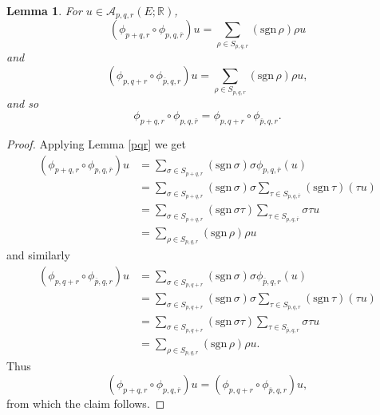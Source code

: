 \documentclass{amsart}
\newcommand{\sgn}{\mathrm{sgn}\,}
\newtheorem{lemma}[theorem]{Lemma}
\theoremstyle{definition}
\begin{document}
\begin{lemma}
For $u \in \mathscr{A}_{p,q,r}(E;\mathbb{R})$,
\[
(\phi_{p+q,r} \circ \phi_{p,q,\overline{r}})u = \sum_{\rho \in S_{p,q,r}} (\sgn \rho) \rho u
\]
and
\[
(\phi_{p,q+r} \circ \phi_{\overline{p},q,r})u = \sum_{\rho \in S_{p,q,r}} (\sgn \rho) \rho u,
\]
and so
\[
\phi_{p+q,r} \circ \phi_{p,q,\overline{r}} = \phi_{p,q+r} \circ \phi_{\overline{p},q,r}.
\]
\label{associative}
\end{lemma}
\begin{proof}
Applying Lemma \ref{pqr} we get
\begin{align*}
(\phi_{p+q,r} \circ \phi_{p,q,\overline{r}})u&=\sum_{\sigma \in S_{p+q,r}} (\sgn \sigma) \sigma \phi_{p,q,\overline{r}}(u)\\
&=\sum_{\sigma \in S_{p+q,r}} (\sgn \sigma) \sigma \sum_{\tau \in S_{p,q,\overline{r}}} (\sgn \tau)(\tau u)\\
&=\sum_{\sigma \in S_{p+q,r}} (\sgn \sigma \tau) \sum_{\tau \in S_{p,q,\overline{r}}} \sigma \tau u\\
&=\sum_{\rho \in S_{p,q,r}} (\sgn \rho) \rho u
\end{align*}
and similarly
\begin{align*}
(\phi_{p,q+r} \circ \phi_{\overline{p},q,r})u&=\sum_{\sigma \in S_{p,q+r}} (\sgn \sigma) \sigma \phi_{\overline{p},q,r}(u)\\
&=\sum_{\sigma \in S_{p,q+r}} (\sgn \sigma) \sigma \sum_{\tau \in S_{\overline{p},q,r}} (\sgn \tau)(\tau u)\\
&=\sum_{\sigma \in S_{p,q+r}} (\sgn \sigma \tau) \sum_{\tau \in S_{\overline{p},q,r}} \sigma \tau u\\
&=\sum_{\rho \in S_{p,q,r}} (\sgn \rho) \rho u.
\end{align*}
Thus
\[
(\phi_{p+q,r} \circ \phi_{p,q,\overline{r}})u=(\phi_{p,q+r} \circ \phi_{\overline{p},q,r})u,
\]
from which the claim follows.
\end{proof}
\end{document}
